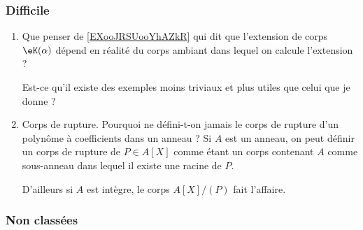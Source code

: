 \subsubsection{Difficile}

\begin{enumerate}
    \item
        Que penser de \ref{EXooJRSUooYhAZkR} qui dit que l'extension de corps \( \eK(\alpha)\) dépend en réalité du corps ambiant dans lequel on calcule l'extension ?

        Est-ce qu'il existe des exemples moins triviaux et plus utiles que celui que je donne ?
    \item
        Corps de rupture. Pourquoi ne défini-t-on jamais le corps de rupture d'un polynôme à coefficients dans un anneau ? Si \( A\) est un anneau, on peut définir un corps de rupture de \( P\in A[X]\) comme étant un corps contenant \( A\) comme sous-anneau dans lequel il existe une racine de \( P\).

        D'ailleurs si \( A\) est intègre, le corps \( A[X]/(P)\) fait l'affaire.
\end{enumerate}

\subsubsection{Non classées}

